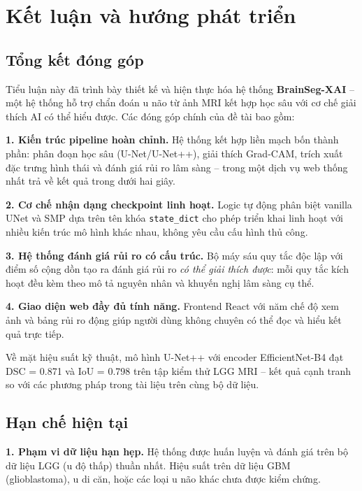 
\chapter{Kết luận và hướng phát triển}

\label{Chapter5}


\section{Tổng kết đóng góp}

Tiểu luận này đã trình bày thiết kế và hiện thực hóa hệ thống \textbf{BrainSeg-XAI} -- một hệ thống hỗ trợ chẩn đoán u não từ ảnh MRI kết hợp học sâu với cơ chế giải thích AI có thể hiểu được. Các đóng góp chính của đề tài bao gồm:

\textbf{1. Kiến trúc pipeline hoàn chỉnh.}
Hệ thống kết hợp liền mạch bốn thành phần: phân đoạn học sâu (U-Net/U-Net++), giải thích Grad-CAM, trích xuất đặc trưng hình thái và đánh giá rủi ro lâm sàng -- trong một dịch vụ web thống nhất trả về kết quả trong dưới hai giây.

\textbf{2. Cơ chế nhận dạng checkpoint linh hoạt.}
Logic tự động phân biệt vanilla UNet và SMP dựa trên tên khóa \texttt{state\_dict} cho phép triển khai linh hoạt với nhiều kiến trúc mô hình khác nhau, không yêu cầu cấu hình thủ công.

\textbf{3. Hệ thống đánh giá rủi ro có cấu trúc.}
Bộ máy sáu quy tắc độc lập với điểm số cộng dồn tạo ra đánh giá rủi ro \textit{có thể giải thích được}: mỗi quy tắc kích hoạt đều kèm theo mô tả nguyên nhân và khuyến nghị lâm sàng cụ thể.

\textbf{4. Giao diện web đầy đủ tính năng.}
Frontend React với năm chế độ xem ảnh và bảng rủi ro động giúp người dùng không chuyên có thể đọc và hiểu kết quả trực tiếp.

Về mặt hiệu suất kỹ thuật, mô hình U-Net++ với encoder EfficientNet-B4 đạt DSC = 0.871 và IoU = 0.798 trên tập kiểm thử LGG MRI -- kết quả cạnh tranh so với các phương pháp trong tài liệu trên cùng bộ dữ liệu.

\section{Hạn chế hiện tại}

\textbf{1. Phạm vi dữ liệu hạn hẹp.}
Hệ thống được huấn luyện và đánh giá trên bộ dữ liệu LGG (u độ thấp) thuần nhất. Hiệu suất trên dữ liệu GBM (glioblastoma), u di căn, hoặc các loại u não khác chưa được kiểm chứng.

